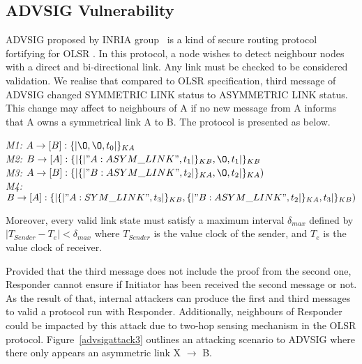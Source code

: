 \subsection{ADVSIG Vulnerability}

ADVSIG proposed by INRIA group~\cite{Raffo:2004:ASS:1029102.1029106} is a kind of secure routing protocol fortifying for OLSR \cite{Clausen:2003:OLS:RFC3626}. In this protocol, a node wishes to detect neighbour nodes with a direct and bi-directional link. Any link must be checked to be considered validation. We realise that compared to OLSR specification, third message of ADVSIG changed SYMMETRIC LINK status to ASYMMETRIC LINK status. This change may affect to neighbours of A if no new message from A informs that A owns a symmetrical link A to B. The protocol is presented as below. 
\begin{flushleft}
 \emph{M1:} $A \to [B]: \{|\O, \O, t_0|\}_{KA}$\\
 \emph{M2:} $B \to [A]: \{|\{|"A:ASYM\_LINK", t_1|\}_{KB}, \O,t_1|\}_{KB}$\\
\emph{M3:} $A \to [B]: \{|\{|"B:ASYM\_LINK",t_2|\}_{KA},\O ,t_2 |\}_{KA})$\\
 \emph{M4:} $B \to [A] : \{|\{|"A:SYM\_LINK", t_3|\}_{KB} ,\{|"B:ASYM\_LINK",t_2|\}_{KA} ,t_3|\}_{KB})$
\end{flushleft}

Moreover, every valid link state must satisfy a maximum interval $\delta_{max}$ defined by $|T_{Sender} - T_e | < \delta_{max}$ where $T_{Sender}$ is the value clock of the sender, and $T_e$ is the value clock of receiver. 

Provided that the third message does not include the proof from the second one, Responder cannot ensure if Initiator has been received the second message or not. As the result of that, internal attackers can produce the first and third messages to valid a protocol run with Responder. Additionally,  neighbours of Responder could be impacted by this attack due to two-hop sensing mechanism in the OLSR protocol.  Figure~\ref{advsigattack3} outlines an attacking scenario to ADVSIG where there only appears an asymmetric link X $\rightarrow$ B.

